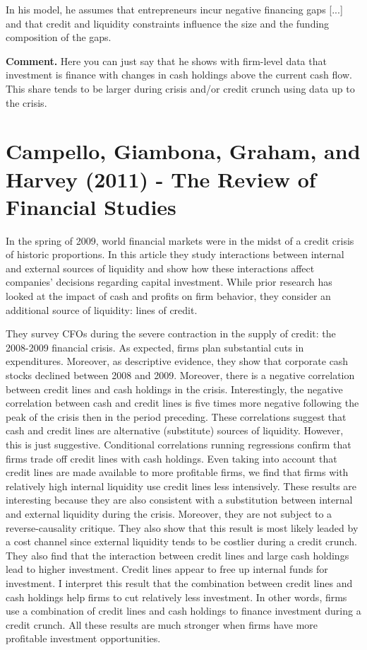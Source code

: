 \documentclass{article}
\begin{document}
{In his model, he assumes that entrepreneurs incur negative financing gaps [...] and that credit and liquidity constraints influence the size and the funding composition of the gaps. 

\textbf{Comment.} Here you can just say that he shows with firm-level data that investment is finance with changes in cash holdings above the current cash flow. This share tends to be larger during crisis and/or credit crunch using data up to the crisis.


\section{Campello, Giambona, Graham, and Harvey (2011) - The Review of Financial Studies}

In the spring of 2009, world financial markets were in the midst of a credit crisis of historic proportions. In this article they study interactions between internal and external sources of liquidity and show how these interactions affect companies' decisions regarding capital investment. While prior research has looked at the impact of cash and profits on firm behavior, they consider an additional source of liquidity: lines of credit. 

They survey CFOs during the severe contraction in the supply of credit: the 2008-2009 financial crisis. As expected, firms plan substantial cuts in expenditures. Moreover, as descriptive evidence, they show that corporate cash stocks declined between 2008 and 2009. Moreover, there is a negative correlation between credit lines and cash holdings in the crisis. Interestingly, the negative correlation between cash and credit lines is five times more negative following the peak of the crisis then in the period preceding. These correlations suggest that cash and credit lines are alternative (substitute) sources of liquidity. However, this is just suggestive. Conditional correlations running regressions confirm that firms trade off credit lines with cash holdings. Even taking into account that credit lines are made available to more profitable firms, we find that firms with relatively high internal liquidity use credit lines less intensively. These results are interesting because they are also consistent with a substitution between internal and external liquidity during the crisis. Moreover, they are not subject to a reverse-causality critique. They also show that this result is most likely leaded by a cost channel since external liquidity tends to be costlier during a credit crunch. They also find that the interaction between credit lines and large cash holdings lead to higher investment. Credit lines appear to free up internal funds for investment. I interpret this result that the combination between credit lines and cash holdings help firms to cut relatively less investment. In other words, firms use a combination of credit lines and cash holdings to finance investment during a credit crunch. All these results are much stronger when firms have more profitable investment opportunities.


}
\end{document}
